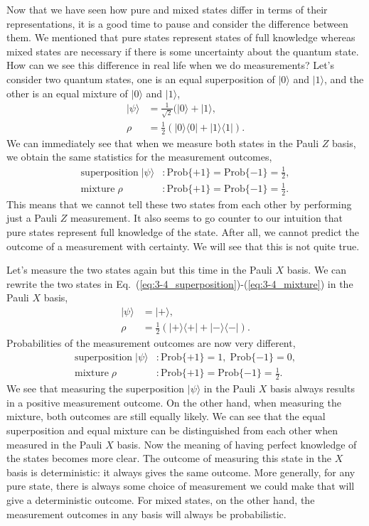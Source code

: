 Now that we have seen how pure and mixed states differ in terms of their representations, it is a good time to pause and consider the difference between them.
We mentioned that pure states represent states of full knowledge whereas mixed states are necessary if there is some uncertainty about the quantum state.
How can we see this difference in real life when we do measurements?
Let's consider two quantum states, one is an equal superposition of $|0\rangle$ and $|1\rangle$, and the other is an equal mixture of $|0\rangle$ and $|1\rangle$,
\begin{align}
    |\psi\rangle & = \frac{1}{\sqrt{2}} (|0\rangle + |1\rangle, \label{eq:3-4_superposition}\\
    \rho & = \frac{1}{2} (|0\rangle\langle0| + |1\rangle\langle1|). \label{eq:3-4_mixture}
\end{align}
We can immediately see that when we measure both states in the Pauli $Z$ basis, we obtain the same statistics for the measurement outcomes,
\begin{align}
    \text{superposition} \; |\psi\rangle & : \text{Prob}\{+1\} = \text{Prob}\{-1\} = \frac{1}{2},  \\
    \text{mixture} \; \rho & : \text{Prob}\{+1\} = \text{Prob}\{-1\} = \frac{1}{2}.
\end{align}
This means that we cannot tell these two states from each other by performing just a Pauli $Z$ measurement.
It also seems to go counter to our intuition that pure states represent full knowledge of the state. After all, we cannot predict the outcome of a measurement with certainty.
We will see that this is not quite true.

Let's measure the two states again but this time in the Pauli $X$ basis.
We can rewrite the two states in Eq.~(\ref{eq:3-4_superposition})-(\ref{eq:3-4_mixture}) in the Pauli $X$ basis,
\begin{align}
    |\psi\rangle & = |+\rangle, \\
    \rho & = \frac{1}{2} (|+\rangle\langle+| + |-\rangle\langle-|).
\end{align}
Probabilities of the measurement outcomes are now very different,
\begin{align}
    \text{superposition} \; |\psi\rangle & : \text{Prob}\{+1\} = 1, \; \text{Prob}\{-1\} = 0,  \\
    \text{mixture} \; \rho & : \text{Prob}\{+1\} = \text{Prob}\{-1\} = \frac{1}{2}.
\end{align}
We see that measuring the superposition $|\psi\rangle$ in the Pauli $X$ basis always results in a positive measurement outcome.
On the other hand, when measuring the mixture, both outcomes are still equally likely.
We can see that the equal superposition and equal mixture can be distinguished from each other when measured in the Pauli $X$ basis.
Now the meaning of having perfect knowledge of the states becomes more clear.
The outcome of measuring this state in the $X$ basis is deterministic: it always gives the same outcome. More generally, for any pure state, there is always some choice of measurement we could make that will give a deterministic outcome. For mixed states, on the other hand, the measurement outcomes in any basis will always be probabilistic.

